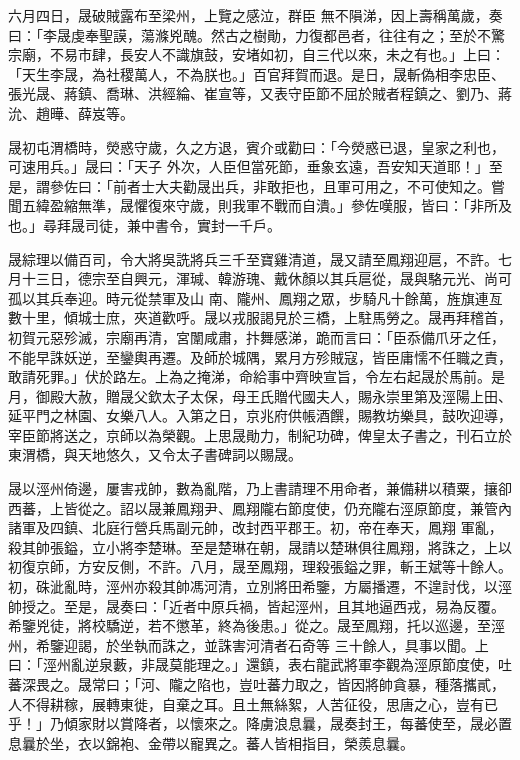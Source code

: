 \begin{pinyinscope}
 六月四日，晟破賊露布至梁州，上覽之感泣，群臣
 無不隕涕，因上壽稱萬歲，奏曰：「李晟虔奉聖謨，蕩滌兇醜。然古之樹勛，力復都邑者，往往有之；至於不驚宗廟，不易市肆，長安人不識旗鼓，安堵如初，自三代以來，未之有也。」上曰：「天生李晟，為社稷萬人，不為朕也。」百官拜賀而退。是日，晟斬偽相李忠臣、張光晟、蔣鎮、喬琳、洪經綸、崔宣等，又表守臣節不屈於賊者程鎮之、劉乃、蔣沇、趙曄、薛岌等。



 晟初屯渭橋時，熒惑守歲，久之方退，賓介或勸曰：「今熒惑已退，皇家之利也，可速用兵。」晟曰：「天子
 外次，人臣但當死節，垂象玄遠，吾安知天道耶！」至是，謂參佐曰：「前者士大夫勸晟出兵，非敢拒也，且軍可用之，不可使知之。嘗聞五緯盈縮無準，晟懼復來守歲，則我軍不戰而自潰。」參佐嘆服，皆曰：「非所及也。」尋拜晟司徒，兼中書令，實封一千戶。



 晟綜理以備百司，令大將吳詵將兵三千至寶雞清道，晟又請至鳳翔迎扈，不許。七月十三日，德宗至自興元，渾瑊、韓游瑰、戴休顏以其兵扈從，晟與駱元光、尚可孤以其兵奉迎。時元從禁軍及山
 南、隴州、鳳翔之眾，步騎凡十餘萬，旌旗連亙數十里，傾城士庶，夾道歡呼。晟以戎服謁見於三橋，上駐馬勞之。晟再拜稽首，初賀元惡殄滅，宗廟再清，宮闈咸肅，抃舞感涕，跪而言曰：「臣忝備爪牙之任，不能早誅妖逆，至鑾輿再遷。及師於城隅，累月方殄賊寇，皆臣庸懦不任職之責，敢請死罪。」伏於路左。上為之掩涕，命給事中齊映宣旨，令左右起晟於馬前。是月，御殿大赦，贈晟父欽太子太保，母王氏贈代國夫人，賜永崇里第及涇陽上田、
 延平門之林園、女樂八人。入第之日，京兆府供帳酒饌，賜教坊樂具，鼓吹迎導，宰臣節將送之，京師以為榮觀。上思晟勛力，制紀功碑，俾皇太子書之，刊石立於東渭橋，與天地悠久，又令太子書碑詞以賜晟。



 晟以涇州倚邊，屢害戎帥，數為亂階，乃上書請理不用命者，兼備耕以積粟，攘卻西蕃，上皆從之。詔以晟兼鳳翔尹、鳳翔隴右節度使，仍充隴右涇原節度，兼管內諸軍及四鎮、北庭行營兵馬副元帥，改封西平郡王。初，帝在奉天，鳳翔
 軍亂，殺其帥張鎰，立小將李楚琳。至是楚琳在朝，晟請以楚琳俱往鳳翔，將誅之，上以初復京師，方安反側，不許。八月，晟至鳳翔，理殺張鎰之罪，斬王斌等十餘人。初，硃泚亂時，涇州亦殺其帥馮河清，立別將田希鑒，方屬播遷，不遑討伐，以涇帥授之。至是，晟奏曰：「近者中原兵禍，皆起涇州，且其地逼西戎，易為反覆。希鑒兇徒，將校驕逆，若不懲革，終為後患。」從之。晟至鳳翔，托以巡邊，至涇州，希鑒迎謁，於坐執而誅之，並誅害河清者石奇等
 三十餘人，具事以聞。上曰：「涇州亂逆泉藪，非晟莫能理之。」還鎮，表右龍武將軍李觀為涇原節度使，吐蕃深畏之。晟常曰；「河、隴之陷也，豈吐蕃力取之，皆因將帥貪暴，種落攜貳，人不得耕稼，展轉東徙，自棄之耳。且土無絲絮，人苦征役，思唐之心，豈有已乎！」乃傾家財以賞降者，以懷來之。降虜浪息曩，晟奏封王，每蕃使至，晟必置息曩於坐，衣以錦袍、金帶以寵異之。蕃人皆相指目，榮羨息曩。




\end{pinyinscope}
